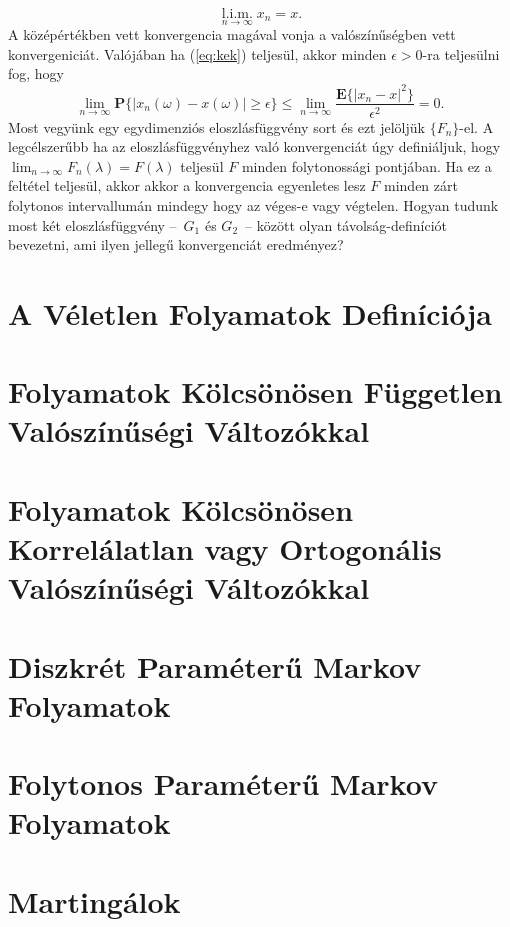 \documentclass{article}
\begin{document}
\begin{equation}
\underset{n \to \infty}{\operatorname{l.i.m.}} x_{n} = x.
	\label{eq:kek}
\end{equation}
A középértékben vett konvergencia magával vonja a valószínűségben vett konvergeniciát. Valójában ha (\ref{eq:kek}) teljesül, akkor minden $\epsilon > 0$-ra teljesülni fog, hogy 
\begin{equation}
	\lim_{n \to \infty} \mathrm{\textbf{P}}\{|x_{n}(\omega) - x(\omega) | \geq \epsilon \} \leq \lim_{n \to \infty} \frac{\mathrm{\textbf{E}}\{|x_n-x|^2\}}{\epsilon^2} = 0.
\label{eq:kek2}
\end{equation}
Most vegyünk egy egydimenziós eloszlásfüggvény sort és ezt jelöljük $\{F_n\}$-el. A legcélszerűbb ha az eloszlásfüggvényhez való konvergenciát úgy definiáljuk, hogy $\lim_{n \to \infty} F_{n}(\lambda) = F(\lambda)$ teljesül $F$ minden folytonossági pontjában. Ha ez a feltétel teljesül, akkor akkor a konvergencia egyenletes lesz $F$ minden zárt folytonos intervallumán mindegy hogy az véges-e vagy végtelen. Hogyan tudunk most két eloszlásfüggvény --~$G_1$ és $G_2$~-- között olyan távolság-definíciót bevezetni, ami ilyen jellegű konvergenciát eredményez? 

\section{A Véletlen Folyamatok Definíciója}\label{sec:veletlenfolyamatokdefinicioja}
\section{Folyamatok Kölcsönösen Független Valószínűségi Változókkal}\label{sec:folyamatokkolcsonosenfuggetlenvaloszinusegivaltozokkal}
\section{Folyamatok Kölcsönösen Korrelálatlan vagy Ortogonális Valószínűségi Változókkal}\label{sec:veletlenfolyamatokdefinicioja}
\section{Diszkrét Paraméterű Markov Folyamatok}\label{sec:diszkretparameterumarkov}
\section{Folytonos Paraméterű Markov Folyamatok}\label{sec:folytonosparameterumarkov}
\section{Martingálok}\label{sec:martingalok}
\end{document}
